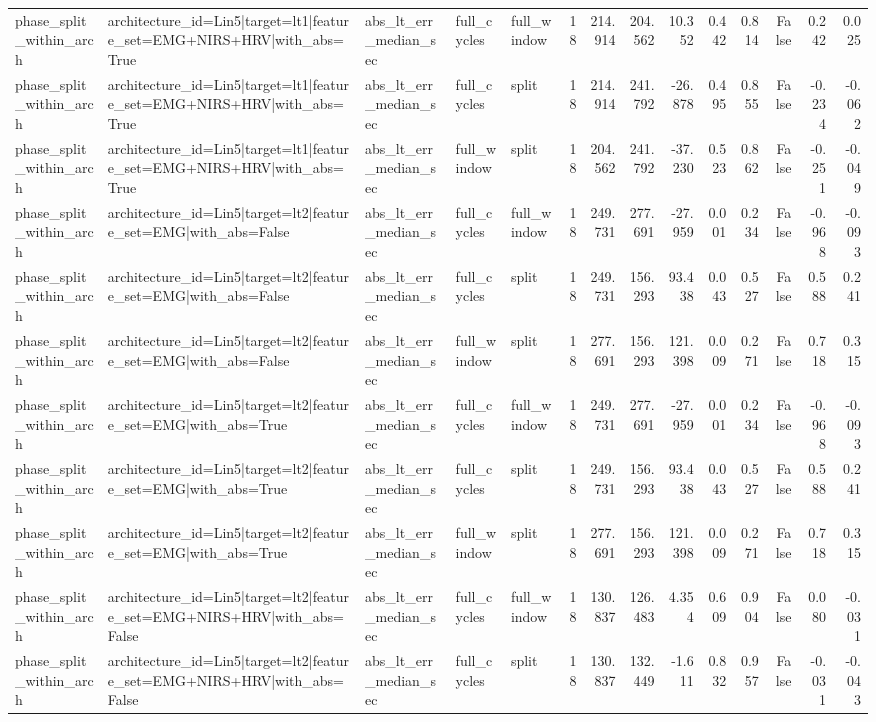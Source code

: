 \begin{table}
\begin{tabular}{lllllrrrrrrrrr}
phase_split_within_arch & architecture_id=Lin5|target=lt1|feature_set=EMG+NIRS+HRV|with_abs=True & abs_lt_err_median_sec & full_cycles & full_window & 18 & 214.914 & 204.562 & 10.352 & 0.442 & 0.814 & False & 0.242 & 0.025 \\
phase_split_within_arch & architecture_id=Lin5|target=lt1|feature_set=EMG+NIRS+HRV|with_abs=True & abs_lt_err_median_sec & full_cycles & split & 18 & 214.914 & 241.792 & -26.878 & 0.495 & 0.855 & False & -0.234 & -0.062 \\
phase_split_within_arch & architecture_id=Lin5|target=lt1|feature_set=EMG+NIRS+HRV|with_abs=True & abs_lt_err_median_sec & full_window & split & 18 & 204.562 & 241.792 & -37.230 & 0.523 & 0.862 & False & -0.251 & -0.049 \\
phase_split_within_arch & architecture_id=Lin5|target=lt2|feature_set=EMG|with_abs=False & abs_lt_err_median_sec & full_cycles & full_window & 18 & 249.731 & 277.691 & -27.959 & 0.001 & 0.234 & False & -0.968 & -0.093 \\
phase_split_within_arch & architecture_id=Lin5|target=lt2|feature_set=EMG|with_abs=False & abs_lt_err_median_sec & full_cycles & split & 18 & 249.731 & 156.293 & 93.438 & 0.043 & 0.527 & False & 0.588 & 0.241 \\
phase_split_within_arch & architecture_id=Lin5|target=lt2|feature_set=EMG|with_abs=False & abs_lt_err_median_sec & full_window & split & 18 & 277.691 & 156.293 & 121.398 & 0.009 & 0.271 & False & 0.718 & 0.315 \\
phase_split_within_arch & architecture_id=Lin5|target=lt2|feature_set=EMG|with_abs=True & abs_lt_err_median_sec & full_cycles & full_window & 18 & 249.731 & 277.691 & -27.959 & 0.001 & 0.234 & False & -0.968 & -0.093 \\
phase_split_within_arch & architecture_id=Lin5|target=lt2|feature_set=EMG|with_abs=True & abs_lt_err_median_sec & full_cycles & split & 18 & 249.731 & 156.293 & 93.438 & 0.043 & 0.527 & False & 0.588 & 0.241 \\
phase_split_within_arch & architecture_id=Lin5|target=lt2|feature_set=EMG|with_abs=True & abs_lt_err_median_sec & full_window & split & 18 & 277.691 & 156.293 & 121.398 & 0.009 & 0.271 & False & 0.718 & 0.315 \\
phase_split_within_arch & architecture_id=Lin5|target=lt2|feature_set=EMG+NIRS+HRV|with_abs=False & abs_lt_err_median_sec & full_cycles & full_window & 18 & 130.837 & 126.483 & 4.354 & 0.609 & 0.904 & False & 0.080 & -0.031 \\
phase_split_within_arch & architecture_id=Lin5|target=lt2|feature_set=EMG+NIRS+HRV|with_abs=False & abs_lt_err_median_sec & full_cycles & split & 18 & 130.837 & 132.449 & -1.611 & 0.832 & 0.957 & False & -0.031 & -0.043 \\

\end{tabular}
\end{table}
